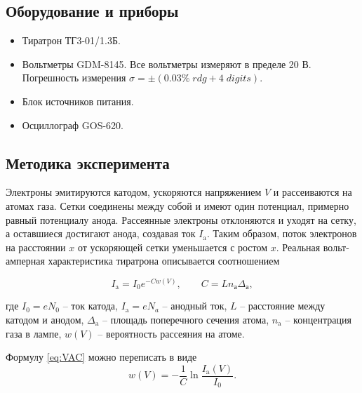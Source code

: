 \documentclass[a4paper, 12pt]{article}
\begin{document}
    \subsection{Оборудование и приборы}

    \begin{itemize}
        \item Тиратрон ТГ3-01/1.3Б.
                    
        \item Вольтметры GDM-8145. Все вольтметры измеряют в пределе 20 В. Погрешность измерения $\sigma = \pm (0.03\% \; rdg + 4 \; digits)$.
		
        \item Блок источников питания.
		
        \item Осциллограф GOS-620. 
    \end{itemize}

    \subsection{Методика эксперимента}

    Электроны эмитируются катодом, ускоряются напряжением $V$ и рассеиваются на атомах газа. Сетки соединены между собой и имеют один потенциал, примерно равный потенциалу анода. Рассеянные электроны отклоняются и уходят на сетку, а оставшиеся достигают анода, создавая ток $I_\text{a}$. Таким образом, поток электронов на расстоянии $x$ от ускоряющей сетки уменьшается с ростом $x$. Реальная вольт-амперная характеристика тиратрона описывается соотношением
    
    \begin{equation}
        \label{eq:VAC}
        I_\text{a} = I_0 e^{- C w(V)}, \qquad C = L n_\text{а} \Delta_{а},
    \end{equation}
    
    где $I_0 = eN_0$ -- ток катода, $I_\text{a} = eN_a$ -- анодный ток, $L$ --  расстояние между катодом и анодом, $\Delta_\text{a}$ -- площадь поперечного сечения атома, $n_\text{a}$ -- концентрация газа в лампе, $w(V)$ -- вероятность рассеяния на атоме.
    
    Формулу \eqref{eq:VAC} можно переписать в виде
    \begin{equation}
        \label{eq:w(V)}
        w(V) = -\dfrac{1}{C}\ln \dfrac{I_\text{a}(V)}{I_0}.
    \end{equation}

    \newpage
	
\end{document}
